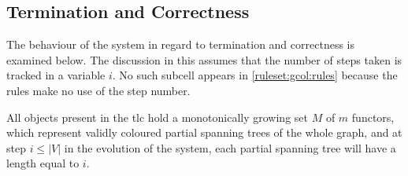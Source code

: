 \subsection{\label{sec:gcol:termination}Termination and Correctness}
The behaviour of the system in regard to termination and correctness is examined below.  The discussion in this  assumes that the number of steps taken is tracked in a variable \(i\).  No such subcell appears in \cref{ruleset:gcol:rules} because the rules make no use of the step number.

\begin{lemma}\label{lemma:gcol:grow}
All \bo{} objects present in the \gls{tlc} hold a monotonically growing set \(M\) of \(m\) functors, which represent validly coloured partial spanning trees of the whole graph, and at step \(i \leq |V|\) in the evolution of the system, each partial spanning tree will have a length equal to \(i\).
\end{lemma}

